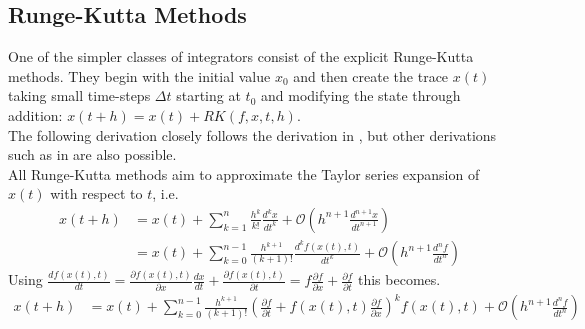 \subsection*{Runge-Kutta Methods}
One of the simpler classes of integrators consist of the explicit Runge-Kutta methods.
They begin with the initial value $x_0$ and then create the trace $x(t)$ taking small time-steps $\Delta t$ starting at $t_0$ and modifying the state through addition: $x(t+h) = x(t) + RK(f,x,t,h)$.\\
The following derivation closely follows the derivation in \cite{lyu2016plasma}, but other derivations such as in \cite{suli2003introduction} are also possible.\\
All Runge-Kutta methods aim to approximate the Taylor series expansion of $x(t)$ with respect to $t$, i.e.
\begin{align*}
x(t+h) &= x(t) + \sum_{k=1}^{n}\frac{h^k}{k!}\frac{d^kx}{dt^k} + \mathcal{O} \left(h^{n+1}\frac{d^{n+1}x}{dt^{n+1}}\right)\\
&= x(t)+ \sum_{k=0}^{n-1}\frac{h^{k+1}}{(k+1)!}\frac{d^kf(x(t),t)}{dt^k} + \mathcal{O}\left(h^{n+1}\frac{d^{n}f}{dt^{n}}\right)
\end{align*}
Using $\frac{df(x(t),t)}{dt} 
= \frac{\partial f(x(t),t)}{\partial x}\frac{dx}{dt}+\frac{\partial f(x(t),t)}{\partial t} 
= f\frac{\partial f}{\partial x}+\frac{\partial f}{\partial t}$
this becomes.
\begin{align*}
x(t+h) &= x(t)+ \sum_{k=0}^{n-1}\frac{h^{k+1}}{(k+1)!}\left(\frac{\partial f}{\partial t} + f(x(t),t)\frac{\partial f}{\partial x}\right)^kf(x(t),t) + \mathcal{O}\left(h^{n+1}\frac{d^{n}f}{dt^{n}}\right)
\end{align*}


